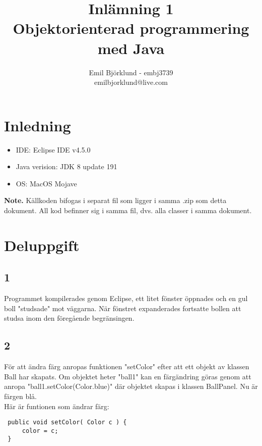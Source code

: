 \documentclass[hidelinks]{article}
\title{Inlämning 1 \\ Objektorienterad programmering med Java}
\author{Emil Björklund - embj3739 \\ emilbjorklund@live.com}
\begin{document}
\maketitle 
\newpage

\section*{Inledning}
\begin {itemize}
\item IDE: Eclipse IDE v4.5.0
\item Java verision: JDK 8 update 191
\item OS: MacOS Mojave
\end{itemize}

\textbf{Note.} Källkoden bifogas i separat fil som ligger i samma .zip som detta dokument. All kod befinner sig i samma fil, dvs. alla classer i samma dokument.

\section*{Deluppgift}
\subsection*{1}
Programmet kompilerades genom Eclipse, ett litet fönster öppnades och en gul boll "studsade" mot väggarna. När fönstret expanderades fortsatte bollen att studsa inom den föregående begränsingen.

\subsection*{2}
För att ändra färg anropas funktionen "setColor" efter att ett objekt av klassen Ball har skapats. Om objektet heter "ball1" kan en färgändring göras genom att anropa "ball1.setColor(Color.blue)" där objektet skapas i klassen BallPanel. Nu är färgen blå.
\\Här är funtionen som ändrar färg:
\begin{verbatim}
 public void setColor( Color c ) {
     color = c;
 }
 \end{verbatim}
\end{document}
